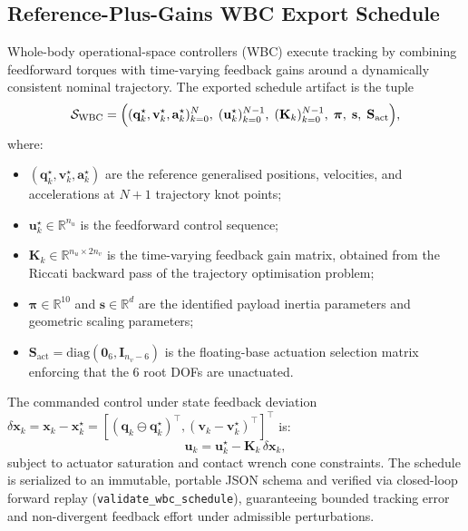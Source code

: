 \documentclass[11pt,a4paper]{article}
\newcommand{\R}{\mathbb{R}}
\newcommand{\bq}{\mathbf{q}}
\newcommand{\bv}{\mathbf{v}}
\newcommand{\ba}{\mathbf{a}}
\newcommand{\bu}{\mathbf{u}}
\newcommand{\bx}{\mathbf{x}}
\newcommand{\bK}{\mathbf{K}}
\newcommand{\bS}{\mathbf{S}}
\newcommand{\bpi}{\boldsymbol{\pi}}
\begin{document}
\subsection{Reference-Plus-Gains WBC Export Schedule}
\label{sec:wbc_export_schedule}
Whole-body operational-space controllers (WBC) execute tracking by combining
feedforward torques with time-varying feedback gains around a dynamically
consistent nominal trajectory.  The exported schedule artifact is the tuple
\begin{equation}
  \mathcal{S}_{\mathrm{WBC}} = \Bigl( (\bq_k^\star, \bv_k^\star, \ba_k^\star)_{k=0}^N,\; (\bu_k^\star)_{k=0}^{N-1},\; (\bK_k)_{k=0}^{N-1},\; \bpi,\; \mathbf{s},\; \bS_{\mathrm{act}} \Bigr),
  \label{eq:wbc_schedule_tuple}
\end{equation}
where:
\begin{itemize}[nosep]
  \item $(\bq_k^\star, \bv_k^\star, \ba_k^\star)$ are the reference generalised positions, velocities, and accelerations at $N+1$ trajectory knot points;
  \item $\bu_k^\star \in \R^{n_u}$ is the feedforward control sequence;
  \item $\bK_k \in \R^{n_u \times 2n_v}$ is the time-varying feedback gain matrix, obtained from the Riccati backward pass of the trajectory optimisation problem;
  \item $\bpi \in \R^{10}$ and $\mathbf{s} \in \R^d$ are the identified payload inertia parameters and geometric scaling parameters;
  \item $\bS_{\mathrm{act}} = \mathrm{diag}(\mathbf{0}_6, \mathbf{I}_{n_v-6})$ is the floating-base actuation selection matrix enforcing that the 6 root DOFs are unactuated.
\end{itemize}
The commanded control under state feedback deviation $\delta\bx_k = \bx_k - \bx_k^\star = [(\bq_k \ominus \bq_k^\star)^{\!\top}, (\bv_k - \bv_k^\star)^{\!\top}]^{\!\top}$ is:
\begin{equation}
  \bu_k = \bu_k^\star - \bK_k\,\delta\bx_k,
  \label{eq:wbc_feedback_law}
\end{equation}
subject to actuator saturation and contact wrench cone constraints.
The schedule is serialized to an immutable, portable JSON schema and verified via
closed-loop forward replay (\texttt{validate\_wbc\_schedule}), guaranteeing bounded
tracking error and non-divergent feedback effort under admissible perturbations.
\end{document}
